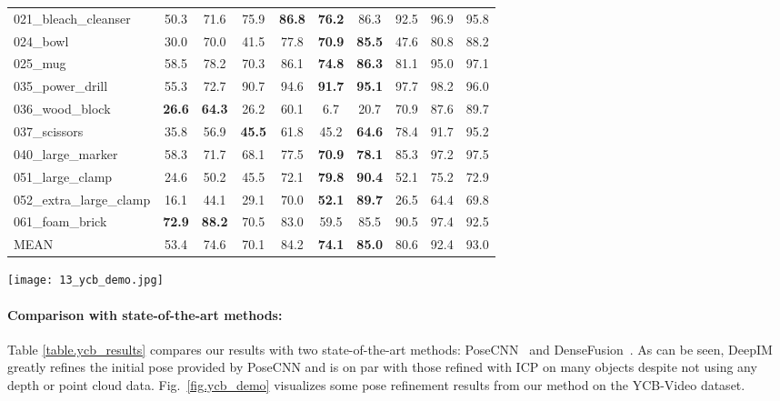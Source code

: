 \documentclass[twocolumn]{svjour3}
\newcommand{\dimnet}[0]{DeepIM}
\begin{document}
\begin{table*}[t]
\begin{tabular}{l|c|c|c|c|c|c|c|c|c}
021\_bleach\_cleanser & 50.3 & 71.6 & 75.9 & \textbf{86.8} & \textbf{76.2} & 86.3 & 92.5 & 96.9 & 95.8 \\
024\_bowl & 30.0 & 70.0 & 41.5 & 77.8 & \textbf{70.9} &\textbf{ 85.5} & 47.6 & 80.8 & 88.2 \\
025\_mug & 58.5 & 78.2 & 70.3 & 86.1 & \textbf{74.8} & \textbf{86.3} & 81.1 & 95.0 & 97.1 \\
035\_power\_drill & 55.3 & 72.7 & 90.7 & 94.6 & \textbf{91.7} & \textbf{95.1} & 97.7 & 98.2 & 96.0 \\
036\_wood\_block &\textbf{ 26.6} &\textbf{ 64.3 }& 26.2 & 60.1 & 6.7 & 20.7 & 70.9 & 87.6 & 89.7 \\
037\_scissors & 35.8 & 56.9 & \textbf{45.5 }& 61.8 & 45.2 & \textbf{64.6} & 78.4 & 91.7 & 95.2 \\
040\_large\_marker & 58.3 & 71.7 & 68.1 & 77.5 & \textbf{70.9} & \textbf{78.1} & 85.3 & 97.2 & 97.5 \\
051\_large\_clamp & 24.6 & 50.2 & 45.5 & 72.1 &\textbf{ 79.8} & \textbf{90.4} & 52.1 & 75.2 & 72.9 \\
052\_extra\_large\_clamp & 16.1 & 44.1 & 29.1 & 70.0 & \textbf{52.1} &\textbf{ 89.7 }& 26.5 & 64.4 & 69.8 \\
061\_foam\_brick & \textbf{72.9} & \textbf{88.2} & 70.5 & 83.0 & 59.5 & 85.5 & 90.5 & 97.4 & 92.5 \\
\hline
MEAN & 53.4 & 74.6 & 70.1 & 84.2 & \textbf{74.1} &\textbf{ 85.0} & 80.6 & 92.4 & 93.0 \\

\hline
\end{tabular}
\label{table.ycb_results}
\end{table*}

\begin{figure*}[t]
	\centering
	\texttt{[image: 13\_ycb\_demo.jpg]}
\caption{Examples of refined poses on the YCB-Video dataset which use results from PoseCNN~\citep{xiang2017posecnn} as initial poses. The red and green lines represent the silhouettes of the initial estimates and our refined poses, respectively.}
\label{fig.ycb_demo}
\end{figure*}

\paragraph{Comparison with state-of-the-art methods:}
Table \ref{table.ycb_results} compares our results with two state-of-the-art methods: PoseCNN~\citep{xiang2017posecnn} and DenseFusion~\citep{wang2019densefusion}. As can be seen, \dimnet~ greatly refines the initial pose provided by PoseCNN and is on par with those refined with ICP on many objects despite not using any depth or point cloud data. Fig.~\ref{fig.ycb_demo} visualizes some pose refinement results from our method on the YCB-Video dataset.
\end{document}
